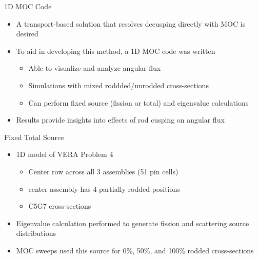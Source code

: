 \begin{frame}[t]{1D MOC Code}
    
    \begin{itemize}
      \item A transport-based solution that resolves decusping directly with 
      MOC is desired
      \item To aid in developing this method, a 1D MOC code was written
      \begin{itemize}
        \item Able to visualize and analyze angular flux
        \item Simulations with mixed roddded/unrodded cross-sections
        \item Can perform fixed source (fission or total) and eigenvalue 
        calculations
      \end{itemize}
      \item Results provide insights into effects of rod cusping on angular flux
    \end{itemize}
    
\end{frame}


\begin{frame}[t]{Fixed Total Source}

\begin{itemize}
  \item 1D model of VERA Problem 4
  \begin{itemize}
    \item Center row across all 3 assemblies (51 pin cells)
    \item center assembly has 4 partially rodded positions
    \item C5G7 cross-sections \cite{EELewisC5G72003,EELewisC5G7extended2005}
  \end{itemize}
  \item Eigenvalue calculation performed to generate fission and scattering 
  source 
  distributions
  \item MOC sweeps used this source for 0\%, 50\%, and 100\% rodded 
  cross-sections
\end{itemize}

\end{frame}


